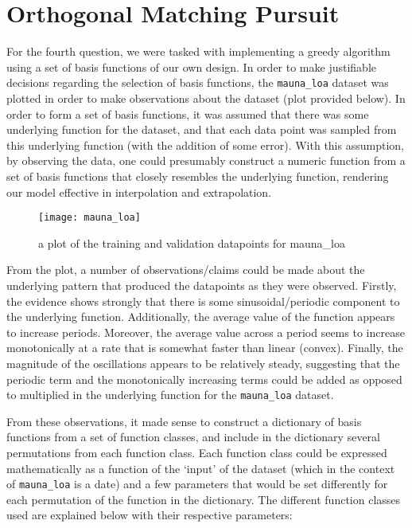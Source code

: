 \documentclass{article}
\begin{document}
\pagebreak
\fi
\section{Orthogonal Matching Pursuit}
For the fourth question, we were tasked with implementing a greedy algorithm using a set of basis functions of our own design. In order to make justifiable decisions regarding the selection of basis functions, the \verb+mauna_loa+ dataset was plotted in order to make observations about the dataset (plot provided below). In order to form a set of basis functions, it was assumed that there was some underlying function for the dataset, and that each data point was sampled from this underlying function (with the addition of some error). With this assumption, by observing the data, one could presumably construct a numeric function from a set of basis functions that closely resembles the underlying function, rendering our model effective in interpolation and extrapolation.

\begin{figure}[H]
\centering
\texttt{[image: mauna\_loa]}
\caption{a plot of the training and validation datapoints for mauna\_loa}
\end{figure}

From the plot, a number of observations/claims could be made about the underlying pattern that produced the datapoints as they were observed. Firstly, the evidence shows strongly that there is some sinusoidal/periodic component to the underlying function. Additionally, the average value of the function appears to increase periods. Moreover, the average value across a period seems to increase monotonically at a rate that is somewhat faster than linear (convex). Finally, the magnitude of the oscillations appears to be relatively steady, suggesting that the periodic term and the monotonically increasing terms could be added as opposed to multiplied in the underlying function for the \verb+mauna_loa+ dataset.

From these observations, it made sense to construct a dictionary of basis functions from a set of function classes, and include in the dictionary several permutations from each function class. Each function class could be expressed mathematically as a function of the `input' of the dataset (which in the context of \verb+mauna_loa+ is a date) and a few parameters that would be set differently for each permutation of the function in the dictionary. The different function classes used are explained below with their respective parameters:
\end{document}
